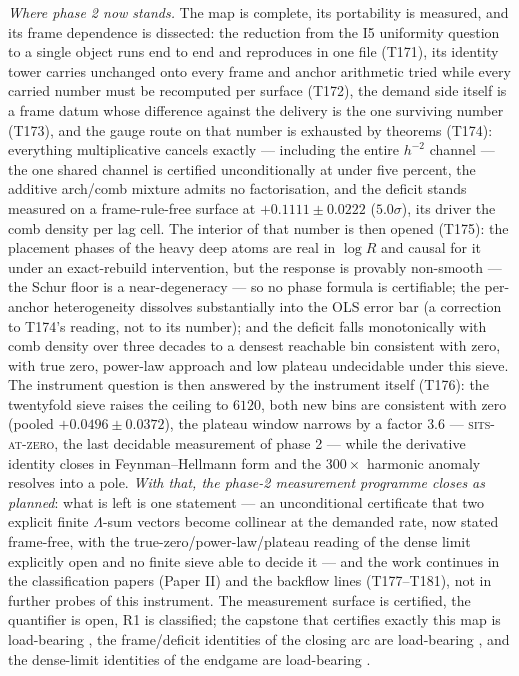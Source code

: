\documentclass[11pt,a4paper]{article}
\begin{document}
\medskip
\noindent\emph{Where phase 2 now stands.} The map is complete, its
portability is measured, and its frame dependence is dissected: the
reduction from the I5 uniformity question to a single object runs end
to end and reproduces in one file (T171), its identity tower carries
unchanged onto every frame and anchor arithmetic tried while every
carried number must be recomputed per surface (T172), the demand side
itself is a frame datum whose difference against the delivery is the
one surviving number (T173), and the gauge route on that number is
exhausted by theorems (T174): everything multiplicative cancels
exactly --- including the entire $h^{-2}$ channel --- the one shared
channel is certified unconditionally at under five percent, the
additive arch/comb mixture admits no factorisation, and the deficit
stands measured on a frame-rule-free surface at $+0.1111\pm0.0222$
($5.0\sigma$), its driver the comb density per lag cell. The interior
of that number is then opened (T175): the placement phases of the
heavy deep atoms are real in $\log R$ and causal for it under an
exact-rebuild intervention, but the response is provably non-smooth
--- the Schur floor is a near-degeneracy --- so no phase formula is
certifiable; the per-anchor heterogeneity dissolves substantially into
the OLS error bar (a correction to T174's reading, not to its number);
and the deficit falls monotonically with comb density over three
decades to a densest reachable bin consistent with zero, with true
zero, power-law approach and low plateau undecidable under this sieve.
The instrument question is then answered by the instrument itself
(T176): the twentyfold sieve raises the ceiling to $6120$, both new
bins are consistent with zero (pooled $+0.0496\pm0.0372$), the plateau
window narrows by a factor $3.6$ --- \textsc{sits-at-zero}, the last
decidable measurement of phase 2 --- while the derivative identity
closes in Feynman--Hellmann form and the $300\times$ harmonic anomaly
resolves into a pole. \emph{With that, the phase-2 measurement
programme closes as planned}: what is left is one statement --- an
unconditional certificate that two explicit finite $\Lambda$-sum
vectors become collinear at the demanded rate, now stated frame-free,
with the true-zero/power-law/plateau reading of the dense limit
explicitly open and no finite sieve able to decide it --- and the
work continues in the classification papers (Paper II) and the
backflow lines (T177--T181), not in further probes of this instrument. The
measurement surface is certified, the quantifier is open, R1 is
classified; the capstone that certifies exactly this map is
load-bearing , the frame/deficit
identities of the closing arc are load-bearing
, and the dense-limit
identities of the endgame are load-bearing
.
\end{document}

